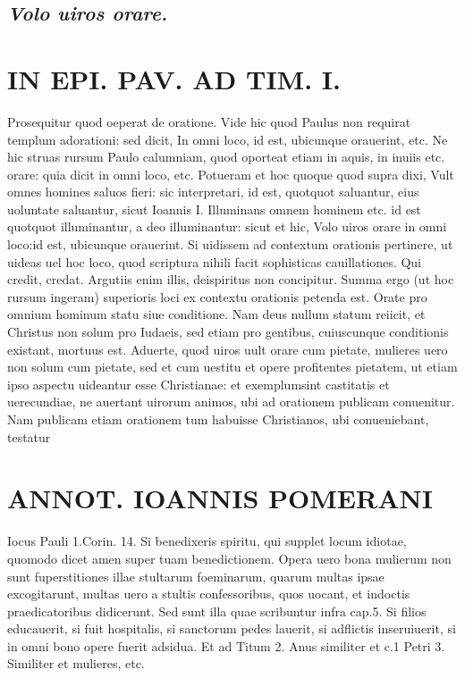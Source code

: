\documentclass{article}
\begin{document}
\begin{pages}
\subsection*{\textit{Volo uiros orare. }}
\section*{IN EPI. PAV. AD TIM. I. }
\marginpar{[ p.85 ]}\pstart Prosequitur quod oeperat de oratione. Vide hic quod Paulus non requirat templum adorationi: sed dicit, In omni loco, id est, ubicunque  orauerint, etc. Ne hic struas rursum Paulo calumniam, quod oporteat etiam in aquis, in inuiis etc. orare: quia dicit in omni loco, etc. Potueram et hoc quoque  quod supra dixi, Vult omnes homines saluos fieri: sic interpretari, id est, quotquot saluantur, eius uoluntate saluantur, sicut Ioannis I. Illuminans omnem hominem etc. id est quotquot illuminantur, a deo illuminantur: sicut et hic, Volo uiros orare in omni loco:id est, ubicunque  orauerint. Si uidissem ad contextum orationis pertinere, ut uideas uel hoc loco, quod scriptura nihili facit sophisticas cauillationes. Qui credit, credat. Argutiis enim illis, deispiritus non concipitur. Summa ergo (ut hoc rursum ingeram) superioris loci ex contextu orationis petenda est. Orate pro omnium hominum statu siue conditione. Nam deus nullum statum reiicit, et Christus non solum pro Iudaeis, sed etiam pro gentibus, cuiuscunque  conditionis existant, mortuus est. Aduerte, quod uiros uult orare cum pietate, mulieres uero non solum cum pietate, sed et cum uestitu et opere profitentes pietatem, ut etiam ipso aspectu uideantur esse Christianae: et exemplumsint castitatis et uerecundiae, ne auertant uirorum animos, ubi ad orationem publicam conuenitur. Nam publicam etiam orationem tum habuisse Christianos, ubi conueniebant, testatur  \pend
\section*{ANNOT. IOANNIS POMERANI }\pstart Iocus Pauli 1.Corin. 14. Si benedixeris spiritu, qui supplet locum idiotae, quomodo dicet amen super tuam benedictionem. Opera uero bona mulierum non sunt fuperstitiones illae stultarum foeminarum, quarum multas ipsae excogitarunt, multas uero a stultis confessoribus, quos uocant, et indoctis praedicatoribus didicerunt. Sed sunt illa quae scribuntur infra cap.5. Si filios educauerit, si fuit hospitalis, si sanctorum pedes lauerit, si adflictis inseruiuerit, si in omni bono opere fuerit adsidua. Et ad Titum 2. Anus similiter et c.1 Petri 3. Similiter et mulieres, etc.  \pend
{}
{}

\end{pages}
\end{document}
